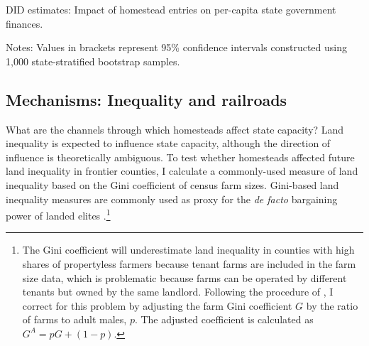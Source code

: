 \documentclass[12pt]{article}
\begin{document}
\begin{table}[htbp]
	\begin{center}
		\caption{DID estimates: Impact of homestead entries on per-capita state government finances. \label{dd-capacity}}
		\resizebox{.8\width}{!}{}
	\end{center}
	\footnotesize{Notes: Values in brackets represent 95\% confidence intervals constructed using 1,000 state-stratified bootstrap samples.}
\end{table}

\subsection{Mechanisms: Inequality and railroads}  \label{mechanisms}

What are the channels through which homesteads affect state capacity? Land inequality is expected to influence state capacity, although the direction of influence is theoretically ambiguous. To test whether homesteads affected future land inequality in frontier counties, I calculate a commonly-used measure of land inequality based on the Gini coefficient of census farm sizes. Gini-based land inequality measures are commonly used as proxy for the \emph{de facto} bargaining power of landed elites \citep[e.g.,][]{boix2003democracy,ziblatt2008does,ansell2015}.\footnote{The Gini coefficient will underestimate land inequality in counties with high shares of propertyless farmers because tenant farms are included in the farm size data, which is problematic because farms can be operated by different tenants but owned by the same landlord. Following the procedure of \citet{vollrath2013inequality}, I correct for this problem by adjusting the farm Gini coefficient $G$ by the ratio of farms to adult males, $p$. The adjusted coefficient is calculated as $G^A = p G + (1-p)$.}%
\end{document}
